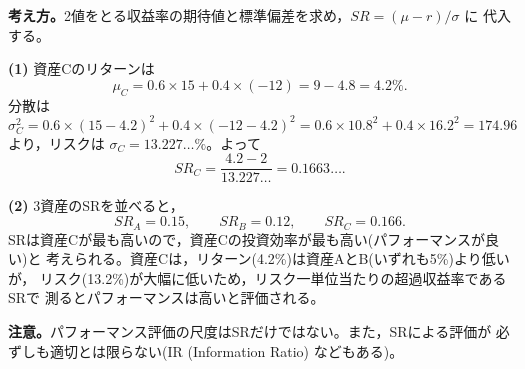 \begin{answerbox}
\textbf{考え方。}2値をとる収益率の期待値と標準偏差を求め，$SR=(\mu-r)/\sigma$ に
代入する。

\medskip
\textbf{(1)}
資産Cのリターンは
\[
\mu_C = 0.6\times 15 + 0.4\times(-12) = 9 - 4.8 = 4.2\%.
\]
分散は
\[
\sigma_C^2 = 0.6\times(15-4.2)^2 + 0.4\times(-12-4.2)^2
= 0.6\times 10.8^2 + 0.4\times 16.2^2 = 174.96
\]
より，リスクは $\sigma_C = 13.227\ldots\%$。よって
\[
SR_C = \frac{4.2 - 2}{13.227\ldots} = 0.1663\ldots.
\]

\medskip
\textbf{(2)}
3資産のSRを並べると，
\[
SR_A = 0.15,\qquad SR_B = 0.12,\qquad SR_C = 0.166.
\]
SRは資産Cが最も高いので，資産Cの投資効率が最も高い(パフォーマンスが良い)と
考えられる。資産Cは，リターン(4.2\%)は資産AとB(いずれも5\%)より低いが，
リスク(13.2\%)が大幅に低いため，リスク一単位当たりの超過収益率であるSRで
測るとパフォーマンスは高いと評価される。

\medskip
\textbf{注意。}パフォーマンス評価の尺度はSRだけではない。また，SRによる評価が
必ずしも適切とは限らない(IR (Information Ratio) などもある)。
\end{answerbox}
